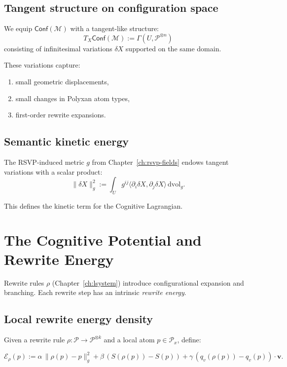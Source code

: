 \subsection{Tangent structure on configuration space}

We equip $\mathsf{Conf}(\mathcal{M})$ with a tangent-like structure:
\[
T_X\mathsf{Conf}(\mathcal{M}) := \Gamma(U, \mathscr{P}^{\otimes n})
\]
consisting of infinitesimal variations $\delta X$ supported on the same domain.

These variations capture:
\begin{enumerate}
  \item small geometric displacements,
  \item small changes in Polyxan atom types,
  \item first-order rewrite expansions.
\end{enumerate}

\subsection{Semantic kinetic energy}

The RSVP-induced metric $g$ from Chapter~\ref{ch:rsvp-fields} endows tangent
variations with a scalar product:
\[
\|\delta X\|_g^2
:=
\int_U
g^{ij}\langle \partial_i \delta X, \partial_j \delta X\rangle \,\mathrm{dvol}_g.
\]

This defines the kinetic term for the Cognitive Lagrangian.

\section{The Cognitive Potential and Rewrite Energy}

Rewrite rules $\rho$ (Chapter~\ref{ch:lsystem}) introduce configurational
expansion and branching. Each rewrite step has an intrinsic \emph{rewrite
energy}.

\subsection{Local rewrite energy density}

Given a rewrite rule $\rho: \mathscr{P}\to\mathscr{P}^{\otimes k}$ and a local
atom $p\in\mathscr{P}_x$, define:

\begin{definition}
\[
\mathcal{E}_\rho(p)
:=
\alpha\,\|\rho(p)-p\|_g^2
+
\beta\,(S(\rho(p))-S(p))
+
\gamma\,(q_v(\rho(p)) - q_v(p))\cdot \mathbf{v}.
\]
\end{definition}

